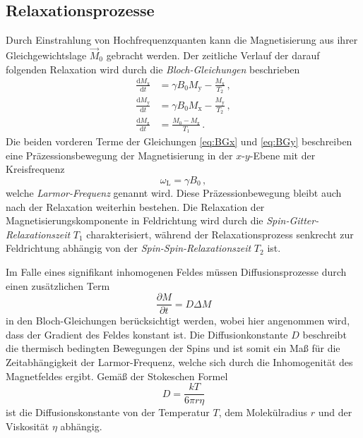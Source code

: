 \subsection{Relaxationsprozesse}
Durch Einstrahlung von Hochfrequenzquanten kann die Magnetisierung aus ihrer Gleichgewichtslage $\vec{M}_0$ gebracht werden.
Der zeitliche Verlauf der darauf folgenden Relaxation wird durch die \textit{Bloch-Gleichungen} beschrieben
\begin{align}
    \frac{\mathrm{d}M_\text{x}}{\mathrm{d}t}&=\gamma B_0M_\text{y}-\frac{M_\text{x}}{T_2}\, , \label{eq:BGx} \\
    \frac{\mathrm{d}M_\text{y}}{\mathrm{d}t}&=\gamma B_0 M_\text{x} - \frac{M_\text{y}}{T_2}\, , \label{eq:BGy} \\
    \frac{\mathrm{d}M_\text{z}}{\mathrm{d}t}&=\frac{M_0-M_\text{z}}{T_1}\, . \label{eq:BGz}
\end{align}
Die beiden vorderen Terme der Gleichungen \eqref{eq:BGx} und \eqref{eq:BGy} beschreiben eine Präzessionsbewegung der Magnetisierung in der $x$-$y$-Ebene mit der Kreisfrequenz
\begin{equation*}
    \omega_\text{L}=\gamma B_0\, ,
\end{equation*}
welche \textit{Larmor-Frequenz} genannt wird.
Diese Präzessionbewegung bleibt auch nach der Relaxation weiterhin bestehen.
Die Relaxation der Magnetisierungskomponente in Feldrichtung wird durch die \textit{Spin-Gitter-Relaxationszeit} $T_1$ charakterisiert, während der Relaxationsprozess senkrecht zur Feldrichtung abhängig von der \textit{Spin-Spin-Relaxationszeit} $T_2$ ist.

Im Falle eines signifikant inhomogenen Feldes müssen Diffusionsprozesse durch einen zusätzlichen Term
\begin{equation*}
    \frac{\partial M}{\partial t} = D \Delta M
\end{equation*}
in den Bloch-Gleichungen berücksichtigt werden, wobei hier angenommen wird, dass der Gradient des Feldes konstant ist.
Die Diffusionkonstante $D$ beschreibt die thermisch bedingten Bewegungen der Spins und ist somit ein Maß für die Zeitabhängigkeit der Larmor-Frequenz, welche sich durch die Inhomogenität des Magnetfeldes ergibt.
Gemäß der Stokeschen Formel
\begin{equation*}
    D=\frac{kT}{6\pi r \eta}
\end{equation*}
ist die Diffusionskonstante von der Temperatur $T$, dem Molekülradius $r$ und der Viskosität $\eta$ abhängig.

